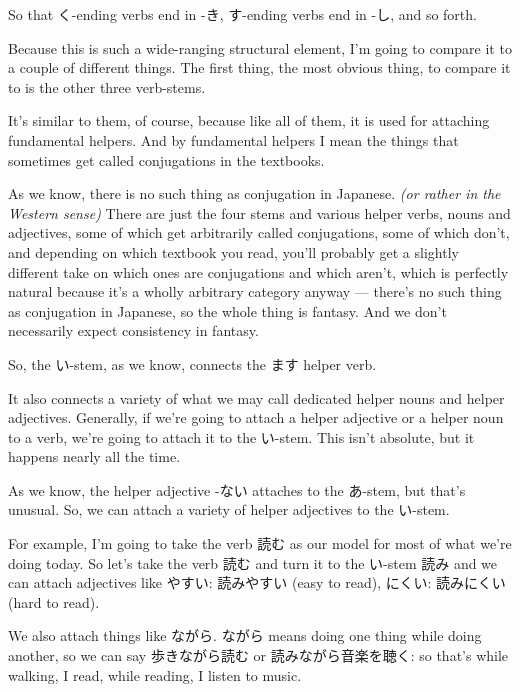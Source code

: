 {}

So that く-ending verbs end in -き, す-ending verbs end in -し, and so forth.

{}

Because this is such a wide-ranging structural element, I'm going to compare it to a couple of different things. The first thing, the most obvious thing, to compare it to is the other three verb-stems.

It's similar to them, of course, because like all of them, it is used for attaching fundamental helpers. And by fundamental helpers I mean the things that sometimes get called conjugations in the textbooks.

As we know, there is no such thing as conjugation in Japanese. {\em (or rather in the Western sense)} There are just the four stems and various helper verbs, nouns and adjectives, some of which get arbitrarily called conjugations, some of which don't, and depending on which textbook you read, you'll probably get a slightly different take on which ones are conjugations and which aren't, which is perfectly natural because it's a wholly arbitrary category anyway --- there's no such thing as conjugation in Japanese, so the whole thing is fantasy. And we don't necessarily expect consistency in fantasy.

\thinrule

So, the い-stem, as we know, connects the ます helper verb.

{}

It also connects a variety of what we may call dedicated helper nouns and helper adjectives. Generally, if we're going to attach a helper adjective or a helper noun to a verb, we're going to attach it to the い-stem. This isn't absolute, but it happens nearly all the time.

As we know, the helper adjective -ない attaches to the あ-stem, but that's unusual. So, we can attach a variety of helper adjectives to the い-stem.

For example, I'm going to take the verb 読む as our model for most of what we're doing today. So let's take the verb 読む and turn it to the い-stem 読み and we can attach adjectives like やすい: 読みやすい (easy to read), にくい: 読みにくい (hard to read).

\thinrule

We also attach things like ながら.\crlf
ながら means doing one thing while doing another, so we can say 歩きながら読む or 読みながら音楽を聴く: so that's while walking, I read, while reading, I listen to music.

